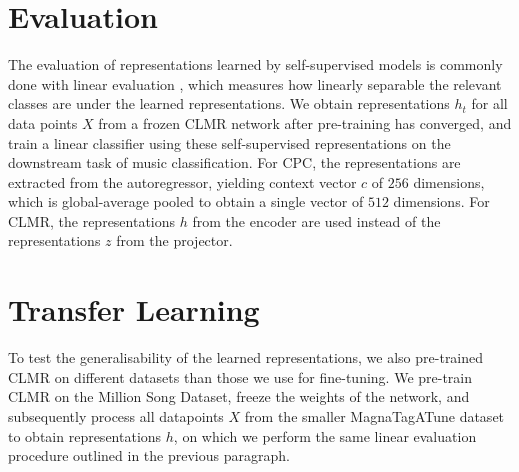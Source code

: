 \section{Evaluation}
\label{sec:evaluation}
The evaluation of representations learned by self-supervised models is commonly done with linear evaluation \cite{oord_representation_2019,hjelm_learning_2019,chen_simple_2020}, which measures how linearly separable the relevant classes are under the learned representations.
We obtain representations $h_t$ for all data points $X$ from a frozen CLMR network after pre-training has converged, and train a linear classifier using these self-supervised representations on the downstream task of music classification.
For CPC, the representations are extracted from the autoregressor, yielding context vector $c$ of $256$ dimensions, which is global-average pooled to obtain a single vector of $512$ dimensions.
For CLMR, the representations $h$ from the encoder are used instead of the representations $z$ from the projector.


\section{Transfer Learning}
To test the generalisability of the learned representations, we also pre-trained CLMR on different datasets than those we use for fine-tuning.
We pre-train CLMR on the Million Song Dataset, freeze the weights of the network, and subsequently process all datapoints $X$ from the smaller MagnaTagATune dataset to obtain representations $h$, on which we perform the same linear evaluation procedure outlined in the previous paragraph.
